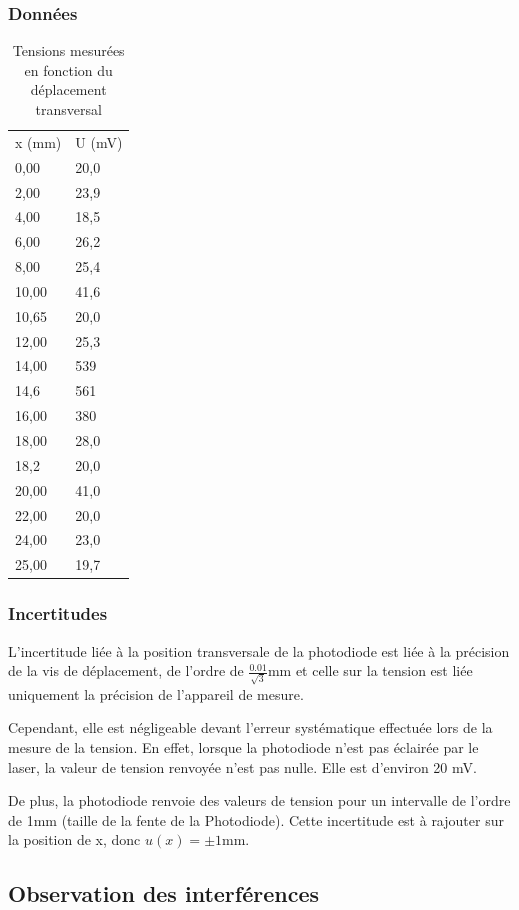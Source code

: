\documentclass[a4paper,10pt,french]{scrartcl}
\begin{document}
\subsubsection{Données}
\begin{table}[H]
\begin{center}
\begin{tabular}{ll}
x (mm) & U (mV)\\
0,00 & 20,0\\
2,00 & 23,9\\
4,00 & 18,5\\
6,00 & 26,2\\
8,00 & 25,4\\
10,00 & 41,6\\
10,65 & 20,0\\
12,00 & 25,3\\
14,00 & 539\\
14,6 & 561\\
16,00 & 380\\
18,00 & 28,0\\
18,2 & 20,0\\
20,00 & 41,0\\
22,00 & 20,0\\
24,00 & 23,0\\
25,00 & 19,7
\end{tabular}
\end{center}
\caption{Tensions mesurées en fonction du déplacement transversal}
\end{table}
\subsubsection{Incertitudes}
L'incertitude liée à la position transversale de la photodiode est liée à la précision de la vis de déplacement, de l'ordre de \(\frac{0.01}{\sqrt{3}}\)mm et celle sur la tension est liée uniquement la précision de l'appareil de mesure.

Cependant, elle est négligeable devant l'erreur systématique effectuée lors de la mesure de la tension. En effet, lorsque la photodiode n'est pas éclairée par le laser, la valeur de tension renvoyée n'est pas nulle. Elle est d'environ 20 mV.

De plus, la photodiode renvoie des valeurs de tension pour un intervalle de l'ordre de 1mm (taille de la fente de la Photodiode). Cette incertitude est à rajouter sur la position de x, donc \(u(x) = \pm 1\)mm.
\subsection{Observation des interférences}
\end{document}
